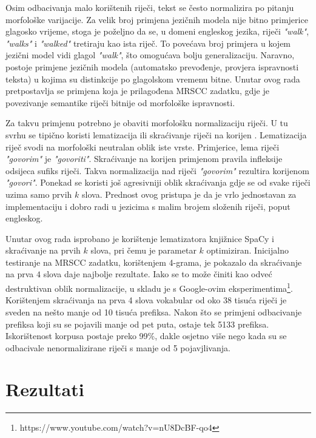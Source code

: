 \documentclass[times, utf8, diplomski, numeric]{fer}
\begin{document}
Osim odbacivanja malo korištenih riječi, tekst se često normalizira po pitanju morfološke varijacije. Za velik broj primjena jezičnih modela nije bitno primjerice glagosko vrijeme, stoga je poželjno da se, u domeni engleskog jezika, riječi \textit{"walk"}, \textit{"walks"} i \textit{"walked"} tretiraju kao ista riječ. To povećava broj primjera u kojem jezični model vidi glagol \textit{"walk"}, što omogućava bolju generalizaciju. Naravno, postoje primjene jezičnih modela (automatsko prevođenje, provjera ispravnosti teksta) u kojima su distinkcije po glagolskom vremenu bitne. Unutar ovog rada pretpostavlja se primjena koja je prilagođena MRSCC zadatku, gdje je povezivanje semantike riječi bitnije od morfološke ispravnosti.

 Za takvu primjenu potrebno je obaviti morfološku normalizaciju riječi. U tu svrhu se tipično koristi lematizacija  ili skraćivanje riječi na korijen . Lematizacija riječ svodi na morfološki neutralan oblik iste vrste. Primjerice, lema riječi \textit{"govorim"} je \textit{"govoriti"}. Skraćivanje na korijen primjenom pravila infleksije odsijeca sufiks riječi. Takva normalizacija nad riječi \textit{"govorim"} rezultira korijenom \textit{"govori"}. Ponekad se koristi još agresivniji oblik skraćivanja gdje se od svake riječi uzima samo prvih $k$ slova. Prednost ovog pristupa je da je vrlo jednostavan za implementaciju i dobro radi u jezicima s malim brojem složenih riječi, poput engleskog.

 Unutar ovog rada isprobano je korištenje lematizatora knjižnice SpaCy i skraćivanje na prvih $k$ slova, pri čemu je parametar $k$ optimiziran. Inicijalno testiranje na MRSCC zadatku, korištenjem 4-grama, je pokazalo da skraćivanje na prva $4$ slova daje najbolje rezultate. Iako se to može činiti kao odveć destruktivan oblik normalizacije, u skladu je s Google-ovim eksperimentima\footnote{https://www.youtube.com/watch?v=nU8DcBF-qo4}. Korištenjem skraćivanja na prva 4 slova vokabular od oko 38 tisuća riječi je sveden na nešto manje od 10 tisuća prefiksa. Nakon što se primjeni odbacivanje prefiksa koji su se pojavili manje od pet puta, ostaje tek 5133 prefiksa. Iskorištenost korpusa postaje preko 99\%, dakle osjetno više nego kada su se odbacivale nenormalizirane riječi s manje od 5 pojavjlivanja.


\section{Rezultati}
\end{document}

